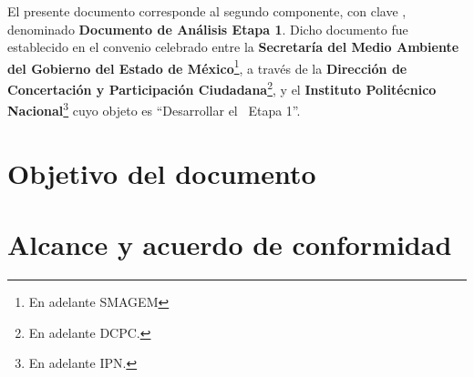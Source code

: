 
El presente documento corresponde al segundo componente, con clave \varCveDocumento, denominado {\bf Documento de Análisis Etapa 1}. Dicho documento fue establecido en el convenio celebrado entre la {\bf Secretaría del Medio Ambiente del Gobierno del Estado de México}\footnote{En adelante SMAGEM}, a través de la {\bf Dirección de Concertación y Participación Ciudadana}\footnote{En adelante DCPC.}, y el {\bf Instituto Politécnico Nacional}\footnote{En adelante IPN.} cuyo objeto es ``Desarrollar el \varSistema{}~Etapa 1''.
	
\section{Objetivo del documento}
    

	

\section{Alcance y acuerdo de conformidad}


